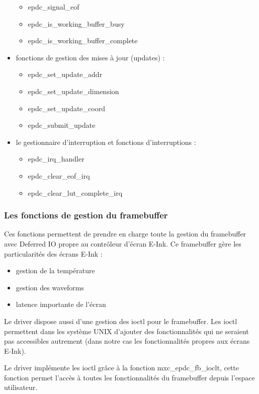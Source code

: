 \begin{itemize}
\begin{itemize}
			\item epdc\_signal\_eof
			\item epdc\_is\_working\_buffer\_busy
			\item epdc\_is\_working\_buffer\_complete
		\end{itemize}
	\item fonctions de gestion des mises à jour (updates) : 
		\begin{itemize}
			\item epdc\_set\_update\_addr
			\item epdc\_set\_update\_dimension
			\item epdc\_set\_update\_coord
			\item epdc\_submit\_update
		\end{itemize}
	\item le gestionnaire d'interruption et fonctions d'interruptions : 
	\begin{itemize}
		\item epdc\_irq\_handler
		\item epdc\_clear\_eof\_irq
		\item epdc\_clear\_lut\_complete\_irq
	\end{itemize}
\end{itemize}

\subsubsection{Les fonctions de gestion du framebuffer}

Ces fonctions permettent de prendre en charge toute la gestion du framebuffer avec Deferred IO 
propre au contrôleur d'écran E-Ink.
Ce framebuffer gère les particularités des écrans E-Ink : 
	\begin{itemize}
		\item gestion de la température
		\item gestion des waveforms
		\item latence importante de l'écran
	\end{itemize}

Le driver dispose aussi d'une gestion des ioctl pour le framebuffer.
Les ioctl permettent dans les système UNIX d'ajouter des fonctionnalités qui ne seraient pas accessibles autrement (dans notre cas les fonctionnalités propres aux écrans E-Ink).

Le driver implémente les ioctl grâce à la fonction mxc\_epdc\_fb\_ioclt, cette fonction permet l'accès à toutes les fonctionnalités du framebuffer depuis l'espace utilisateur.

